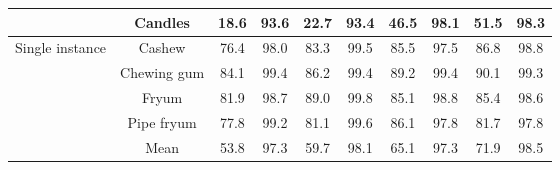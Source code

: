 \documentclass[runningheads]{llncs}
\begin{document}
\begin{table*}[!ht]
{\begin{tabular}{cc|cccc|cccc}
    \multicolumn{1}{c|}{}                                    & Candles     & 18.6  & 93.6                        & 22.7        & 93.4        & 46.5  & 98.1                        & 51.5       & 98.3        \\ \hline
    \multicolumn{1}{c|}{\multirow{4}{*}{Single instance}}    & Cashew      & 76.4  & 98.0                        & 83.3        & 99.5        & 85.5  & 97.5                        & 86.8       & 98.8        \\
    \multicolumn{1}{c|}{}                                    & Chewing gum & 84.1  & 99.4                        & 86.2        & 99.4        & 89.2  & 99.4                        & 90.1       & 99.3        \\
    \multicolumn{1}{c|}{}                                    & Fryum       & 81.9  & 98.7                        & 89.0        & 99.8        & 85.1  & 98.8                        & 85.4       & 98.6        \\
    \multicolumn{1}{c|}{}                                    & Pipe fryum  & 77.8  & 99.2                        & 81.1        & 99.6        & 86.1  & 97.8                        & 81.7       & 97.8        \\ \hline
    \multicolumn{1}{c|}{}                                    & Mean        &  53.8 & 97.3 & 59.7 & 98.1 & 65.1 & 97.3 & 71.9 & 98.5           \\ \hline
    \end{tabular}}
\end{table*}
\end{document}
